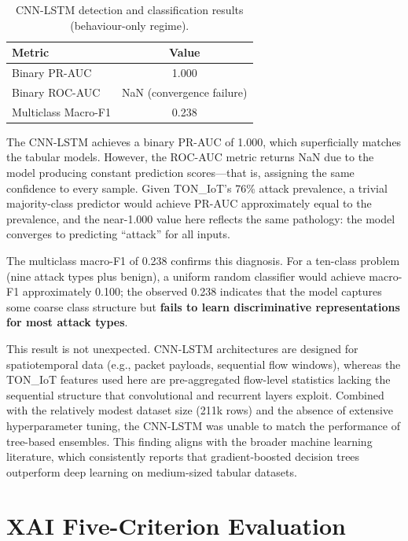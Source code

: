 \documentclass[12pt,a4paper]{report}
\begin{document}
\begin{table}[H]
\centering
\caption{CNN-LSTM detection and classification results (behaviour-only regime).}
\label{tab:cnnlstm}
\begin{tabular}{lc}
\toprule
\textbf{Metric} & \textbf{Value} \\
\midrule
Binary PR-AUC & 1.000 \\
Binary ROC-AUC & NaN (convergence failure) \\
Multiclass Macro-F1 & 0.238 \\
\bottomrule
\end{tabular}
\end{table}

The CNN-LSTM achieves a binary PR-AUC of 1.000, which superficially matches the tabular models. However, the ROC-AUC metric returns NaN due to the model producing constant prediction scores---that is, assigning the same confidence to every sample. Given TON\_IoT's 76\% attack prevalence, a trivial majority-class predictor would achieve PR-AUC approximately equal to the prevalence, and the near-1.000 value here reflects the same pathology: the model converges to predicting ``attack'' for all inputs.

The multiclass macro-F1 of 0.238 confirms this diagnosis. For a ten-class problem (nine attack types plus benign), a uniform random classifier would achieve macro-F1 approximately 0.100; the observed 0.238 indicates that the model captures some coarse class structure but \textbf{fails to learn discriminative representations for most attack types}.

This result is not unexpected. CNN-LSTM architectures are designed for spatiotemporal data (e.g., packet payloads, sequential flow windows), whereas the TON\_IoT features used here are pre-aggregated flow-level statistics lacking the sequential structure that convolutional and recurrent layers exploit. Combined with the relatively modest dataset size (211k rows) and the absence of extensive hyperparameter tuning, the CNN-LSTM was unable to match the performance of tree-based ensembles. This finding aligns with the broader machine learning literature, which consistently reports that gradient-boosted decision trees outperform deep learning on medium-sized tabular datasets.

\section{XAI Five-Criterion Evaluation}
\label{sec:xai-results}
\end{document}

